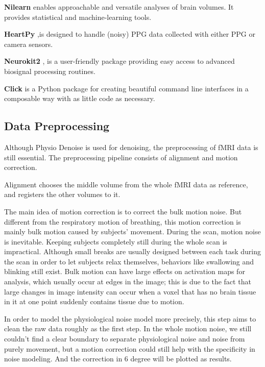 \textbf{Nilearn} enables approachable and versatile analyses of brain volumes. It provides statistical and machine-learning tools.

\textbf{HeartPy} \cite{van2019heartpy},is designed to handle (noisy) PPG data collected with either PPG or camera sensors.

\textbf{Neurokit2} \cite{Makowski2021neurokit}, is a user-friendly package providing easy access to advanced biosignal processing routines.

\textbf{Click} is a Python package for creating beautiful command line interfaces in a composable way with as little code as necessary.


\subsection{Data Preprocessing}

Although Physio Denoise is used for denoising, the preprocessing of fMRI data is still essential.
The preprocessing pipeline consists of alignment and motion correction.

Alignment chooses the middle volume from the whole fMRI data as reference, and registers the other
volumes to it. 

The main idea of motion correction is to correct the bulk motion noise. 
But different from the respiratory motion of breathing, this motion correction
is mainly bulk motion caused by subjects' movement. During the scan, motion noise is inevitable. 
Keeping subjects completely still during the whole scan is impractical.
Although small breaks are usually designed between each task during the scan in order to let subjects relax themselves, 
behaviors like swallowing and blinking still exist.
Bulk motion can have large effects on activation maps for analysis, 
which usually occur at edges in the image; 
this is due to the fact that large changes in image intensity can occur 
when a voxel that has no brain tissue in it at one point 
suddenly contains tissue due to motion. \cite{poldrack2011handbook}



In order to model the physiological noise model more precisely, 
this step aims to clean the raw data roughly as the first step.
In the whole motion noise, we still couldn't find a clear boundary
to separate physiological noise and noise from purely movement, but a motion correction could
still help with the specificity in noise modeling. And the correction in 6 degree will be plotted 
as results.

